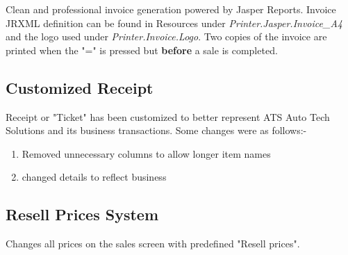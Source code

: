 Clean and professional invoice generation powered by Jasper Reports. Invoice JRXML definition can be found in Resources under \textit{Printer.Jasper.Invoice\_A4} and the logo used under \textit{Printer.Invoice.Logo}. Two copies of the invoice are printed when the "=" is pressed but \textbf{before} a sale is completed.


\subsection{Customized Receipt}

Receipt or "Ticket" has been customized to better represent ATS Auto Tech Solutions and its business transactions. Some changes were as follows:-

\begin{enumerate}
	\item Removed unnecessary columns to allow longer item names
	
	\item changed details to reflect business
\end{enumerate}



\subsection{Resell Prices System}

Changes all prices on the sales screen with predefined "Resell prices".